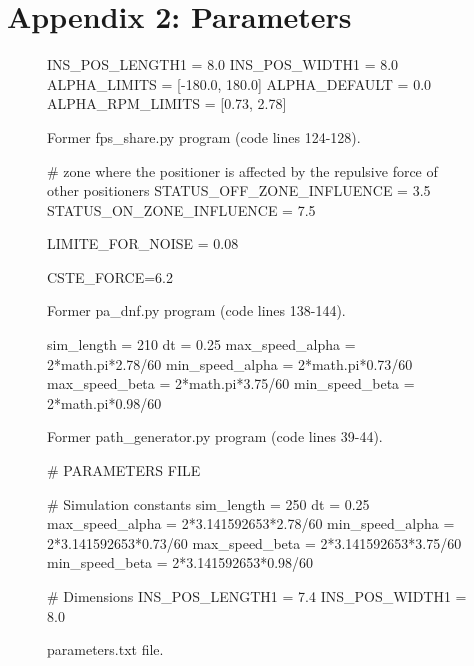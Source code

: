 \section{Appendix 2: Parameters}

\begin{figure}[h]
\begin{center}
	\scriptsize{
	\begin{python}
INS_POS_LENGTH1 = 8.0
INS_POS_WIDTH1 = 8.0
ALPHA_LIMITS = [-180.0, 180.0]
ALPHA_DEFAULT = 0.0
ALPHA_RPM_LIMITS = [0.73, 2.78]
	\end{python}
	}
	\caption{Former fps_share.py program (code lines 124-128).}
	\label{fig:appendix:parameters_former_fps}
\end{center}
\end{figure}

\begin{figure}[h]
\begin{center}
	\scriptsize{
	\begin{python}
# zone where the positioner is affected by the repulsive force of other positioners
STATUS_OFF_ZONE_INFLUENCE = 3.5
STATUS_ON_ZONE_INFLUENCE = 7.5

LIMITE_FOR_NOISE = 0.08

CSTE_FORCE=6.2
	\end{python}
	}
	\caption{Former pa_dnf.py program (code lines 138-144).}
	\label{fig:appendix:parameters_former_pa_dnf}
\end{center}
\end{figure}


\begin{figure}[h]
\begin{center}
	\scriptsize{
	\begin{python}
sim_length = 210
dt = 0.25
max_speed_alpha = 2*math.pi*2.78/60
min_speed_alpha = 2*math.pi*0.73/60
max_speed_beta = 2*math.pi*3.75/60
min_speed_beta = 2*math.pi*0.98/60
	\end{python}
	}
	\caption{Former path_generator.py program (code lines 39-44).}
	\label{fig:appendix:parameters_former_path}
\end{center}
\end{figure}


\begin{figure}[h]
\begin{center}
	\scriptsize{
	\begin{python}
# PARAMETERS FILE

# Simulation constants
sim_length = 250
dt = 0.25
max_speed_alpha = 2*3.141592653*2.78/60
min_speed_alpha = 2*3.141592653*0.73/60
max_speed_beta = 2*3.141592653*3.75/60 
min_speed_beta = 2*3.141592653*0.98/60

# Dimensions 
INS_POS_LENGTH1 = 7.4
INS_POS_WIDTH1 = 8.0
	\end{python}
	}
	\caption{parameters.txt file.}
	\label{}
\end{center}
\end{figure}


